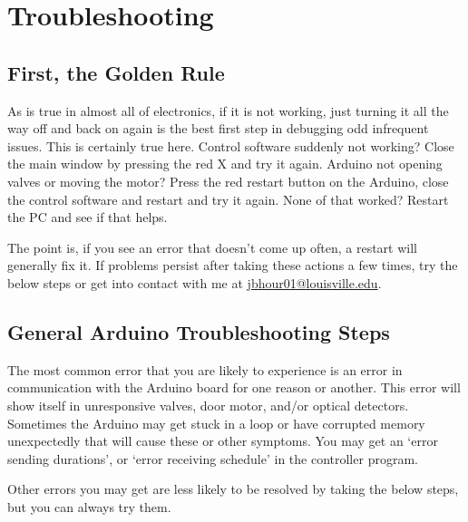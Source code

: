 \documentclass{article}
\begin{document}
\section{Troubleshooting}
\label{sec:trouble}

\subsection{First, the Golden Rule}
As is true in almost all of electronics, if it is not working, just turning it all the way off and back on again is the best first step in debugging odd infrequent issues. 
This is certainly true here. Control software suddenly not 
working? Close the main window by pressing the red X and try it again. Arduino not opening valves or moving the motor? Press the red restart button on the Arduino, close the control 
software and restart and try it again. None of that worked? Restart the PC and see if that helps. 
\par 
The point is, if you see an error that doesn't come up often, a restart will generally fix it. If problems persist after taking these actions a few times, try the below steps
or get into contact with me at \url{jbhour01@louisville.edu}.

\subsection{General Arduino Troubleshooting Steps}
The most common error that you are likely to experience is an error in communication with the Arduino board for one reason or another. This error will show itself in unresponsive valves, 
door motor, and/or optical detectors. Sometimes the Arduino may get stuck in a loop or have corrupted memory unexpectedly that will cause these or other symptoms. You may get an
`error sending durations', or `error receiving schedule' in the controller program.
\par Other errors you may get are less likely to be resolved by taking the below steps, but you can always try them. 
\end{document}
